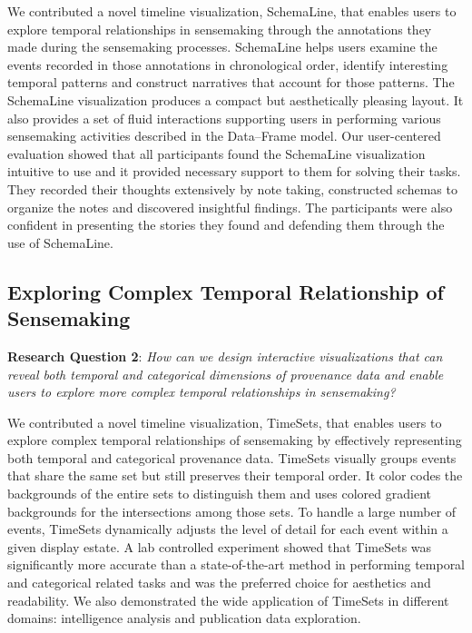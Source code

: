 We contributed a novel timeline visualization, SchemaLine, that enables users to explore temporal relationships in sensemaking through the annotations they made during the sensemaking processes. SchemaLine helps users examine the events recorded in those annotations in chronological order, identify interesting temporal patterns and construct narratives that account for those patterns. The SchemaLine visualization produces a compact but aesthetically pleasing layout. It also provides a set of fluid interactions supporting users in performing various sensemaking activities described in the Data--Frame model. Our user-centered evaluation showed that all participants found the SchemaLine visualization intuitive to use and it provided necessary support to them for solving their tasks. They recorded their thoughts extensively by note taking, constructed schemas to organize the notes and discovered insightful findings. The participants were also confident in presenting the stories they found and defending them through the use of SchemaLine.

\subsection{Exploring Complex Temporal Relationship of Sensemaking}
\textbf{Research Question 2}: \emph{How can we design interactive visualizations that can reveal both temporal and categorical dimensions of provenance data and enable users to explore more complex temporal relationships in sensemaking?}

We contributed a novel timeline visualization, TimeSets, that enables users to explore complex temporal relationships of sensemaking by effectively representing both temporal and categorical provenance data. TimeSets visually groups events that share the same set but still preserves their temporal order. It color codes the backgrounds of the entire sets to distinguish them and uses colored gradient backgrounds for the intersections among those sets. To handle a large number of events, TimeSets dynamically adjusts the level of detail for each event within a given display estate. A lab controlled experiment showed that TimeSets was significantly more accurate than a state-of-the-art method in performing temporal and categorical related tasks and was the preferred choice for aesthetics and readability. We also demonstrated the wide application of TimeSets in different domains: intelligence analysis and publication data exploration.

